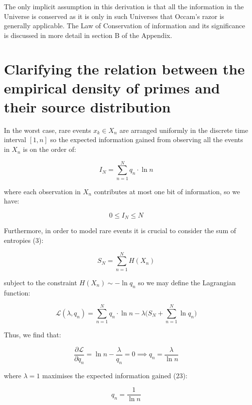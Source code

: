 \documentclass{article}
\begin{document}
The only implicit assumption in this derivation is that all the information in the Universe is conserved as it is only in such Universes that Occam's razor is generally applicable. The Law of Conservation of information and its significance is discussed in more detail in section B of the Appendix. 

\newpage

\section{Clarifying the relation between the empirical density of primes and their source distribution}

In the worst case, rare events $x_k \in X_n$ are arranged uniformly in the discrete time interval $[1,n]$ so the expected information gained from observing all the events in $X_n$ is on the order of: 

\begin{equation}
I_N = \sum_{n=1}^N q_n \cdot \ln n	
\end{equation}

where each observation in $X_n$ contributes at most one bit of information, so we have: 

\begin{equation}
0 \leq I_N \leq N	
\end{equation}

Furthermore, in order to model rare events it is crucial to consider the sum of entropies (3): 

\begin{equation}
S_N = \sum_{n=1}^N H(X_n)	
\end{equation}

subject to the constraint $H(X_n) \sim -\ln q_n$ so we may define the Lagrangian function: 

\begin{equation}
\mathcal{L}(\lambda, q_n) = \sum_{n=1}^N q_n \cdot \ln n - \lambda \big(S_N + \sum_{n=1}^N \ln q_n \big)	
\end{equation}

Thus, we find that: 

\begin{equation}
\frac{\partial \mathcal{L}}{\partial q_n} = \ln n - \frac{\lambda}{q_n} = 0 \implies q_n = \frac{\lambda}{\ln n}	
\end{equation}

where $\lambda = 1$ maximises the expected information gained (23): 

\begin{equation}
q_n = \frac{1}{\ln n}	
\end{equation}
\end{document}
